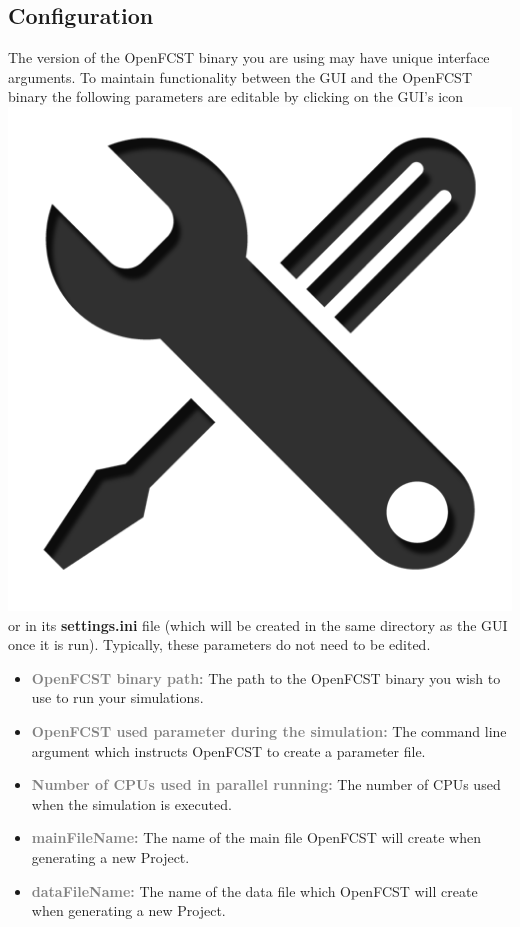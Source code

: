 \subsection{Configuration}
The version of the OpenFCST binary you are using may have unique interface arguments. To maintain functionality between the GUI and the OpenFCST binary the following parameters are editable by clicking on the GUI's icon \includegraphics[scale=0.025]{./figures/GUI/settings_icon} or in its \textbf{settings.ini} file (which will be created in the same directory as the GUI once it is run). Typically, these parameters do not need to be edited.

\begin{itemize}
 \item \textcolor{grey}{\textbf{OpenFCST binary path:}} The path to the OpenFCST binary you wish to use to run your simulations.
 \item \textcolor{grey}{\textbf{OpenFCST used parameter during the simulation:}} The command line argument which instructs OpenFCST to create a parameter file.
 \item \textcolor{grey}{\textbf{Number of CPUs used in parallel running:}} The number of CPUs used when the simulation is executed.
 \item \textcolor{grey}{\textbf{mainFileName:}} The name of the main file OpenFCST will create when generating a new Project.
 \item \textcolor{grey}{\textbf{dataFileName:}} The name of the data file which OpenFCST will create when generating a new Project.
\end{itemize}


